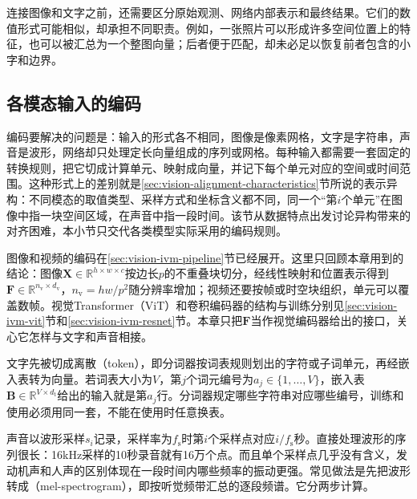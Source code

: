 连接图像和文字之前，还需要区分原始观测、网络内部表示和最终结果。它们的数值形式可能相似，却承担不同职责。例如，一张照片可以形成许多空间位置上的特征，也可以被汇总为一个整图向量；后者便于匹配，却未必足以恢复前者包含的小字和边界。

\subsection{各模态输入的编码}
\label{sec:vision-models-encoding}

编码要解决的问题是：输入的形式各不相同，图像是像素网格，文字是字符串，声音是波形，网络却只处理定长向量组成的序列或网格。每种输入都需要一套固定的转换规则，把它切成计算单元、映射成向量，并记下每个单元对应的空间或时间范围。这种形式上的差别就是\ref{sec:vision-alignment-characteristics}节所说的表示异构：不同模态的取值类型、采样方式和坐标含义都不同，同一个“第$i$个单元”在图像中指一块空间区域，在声音中指一段时间。该节从数据特点出发讨论异构带来的对齐困难，本小节只交代各类模型实际采用的编码规则。

图像和视频的编码在\ref{sec:vision-ivm-pipeline}节已经展开。这里只回顾本章用到的结论：图像$\bm X\in\mathbb R^{h\times w\times c}$按边长$p$的不重叠块切分，经线性映射和位置表示得到$\bm F\in\mathbb R^{n_{\mathrm v}\times d_{\mathrm v}}$，$n_{\mathrm v}=hw/p^2$随分辨率增加；视频还要按帧或时空块组织，单元可以覆盖数帧。视觉Transformer（ViT）和卷积编码器的结构与训练分别见\ref{sec:vision-ivm-vit}节和\ref{sec:vision-ivm-resnet}节。本章只把$\bm F$当作视觉编码器给出的接口，关心它怎样与文字和声音相接。

文字先被切成离散（token），即分词器按词表规则划出的字符或子词单元，再经嵌入表转为向量。若词表大小为$V$，第$j$个词元编号为$a_j\in\{1,\ldots,V\}$，嵌入表$\bm B\in\mathbb R^{V\times d_{\mathrm t}}$给出的输入就是第$a_j$行。分词器规定哪些字符串对应哪些编号，训练和使用必须用同一套，不能在使用时任意换表。

声音以波形采样$s_i$记录，采样率为$f_{\mathrm s}$时第$i$个采样点对应$i/f_{\mathrm s}$秒。直接处理波形的序列很长：16kHz采样的10秒录音就有16万个点。而且单个采样点几乎没有含义，发动机声和人声的区别体现在一段时间内哪些频率的振动更强。常见做法是先把波形转成（mel-spectrogram），即按听觉频带汇总的逐段频谱。它分两步计算。

